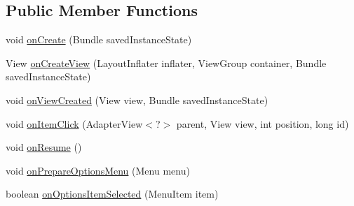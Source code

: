 \subsection*{Public Member Functions}
\begin{DoxyCompactItemize}
\item 
void \hyperlink{classorg_1_1buildmlearn_1_1toolkit_1_1fragment_1_1LoadApkFragment_ab4d579c0200a862bbc2d26233f447e9a}{on\+Create} (Bundle saved\+Instance\+State)
\item 
View \hyperlink{classorg_1_1buildmlearn_1_1toolkit_1_1fragment_1_1LoadApkFragment_a73fa1b3e175b75a32310c1c8a7eb2e28}{on\+Create\+View} (Layout\+Inflater inflater, View\+Group container, Bundle saved\+Instance\+State)
\item 
void \hyperlink{classorg_1_1buildmlearn_1_1toolkit_1_1fragment_1_1LoadApkFragment_a2be46eb7d1d4403b2195e92bebdad3a2}{on\+View\+Created} (View view, Bundle saved\+Instance\+State)
\item 
void \hyperlink{classorg_1_1buildmlearn_1_1toolkit_1_1fragment_1_1LoadApkFragment_af09669972c93dd57b83cf5df015dc609}{on\+Item\+Click} (Adapter\+View$<$?$>$ parent, View view, int position, long id)
\item 
void \hyperlink{classorg_1_1buildmlearn_1_1toolkit_1_1fragment_1_1LoadApkFragment_ab62c44f91792cb265894f0c14a534a11}{on\+Resume} ()
\item 
void \hyperlink{classorg_1_1buildmlearn_1_1toolkit_1_1fragment_1_1LoadApkFragment_aadcf34c154a9917b34129c081a90524f}{on\+Prepare\+Options\+Menu} (Menu menu)
\item 
boolean \hyperlink{classorg_1_1buildmlearn_1_1toolkit_1_1fragment_1_1LoadApkFragment_ac3341a0c126129e4abd0b3483cdb4225}{on\+Options\+Item\+Selected} (Menu\+Item item)
\end{DoxyCompactItemize}

